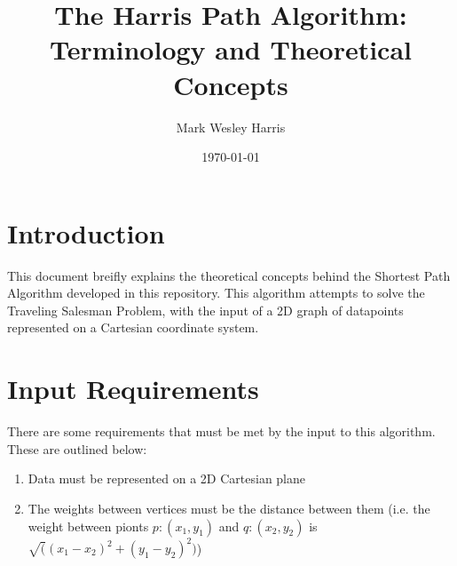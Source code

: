 \documentclass[12pt]{article}
\title{The Harris Path Algorithm:\\
Terminology and Theoretical Concepts}
\author{
Mark Wesley Harris
}
\date{\today}
\begin{document}
\maketitle

\section{Introduction}\label{sec:intro}
This document breifly explains the theoretical concepts behind the
Shortest Path Algorithm developed in this repository. This algorithm attempts
to solve the Traveling Salesman Problem, with the input of a 2D graph of datapoints
represented on a Cartesian coordinate system.

\section{Input Requirements}\label{sec:req}
There are some requirements that must be met by the input to this algorithm.
These are outlined below:
\begin{enumerate}
\item Data must be represented on a 2D Cartesian plane
\item The weights between vertices must be the distance between them
(i.e. the weight between pionts $p:(x_1, y_1)$ and $q:(x_2, y_2)$ is $\sqrt((x_1 - x_2)^2 + (y_1 - y_2)^2)$)
\end{enumerate}
\end{document}
